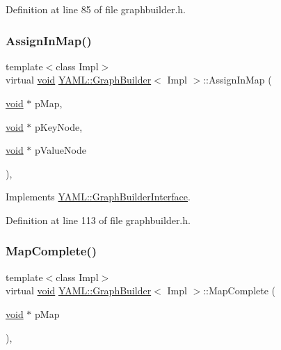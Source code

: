 Definition at line 85 of file graphbuilder.\+h.

\mbox{\label{class_y_a_m_l_1_1_graph_builder_a5f92ce9e395edd4a3ab8e3e6d772b570}} 
\subsubsection{\texorpdfstring{AssignInMap()}{AssignInMap()}}
{\footnotesize\ttfamily template$<$class Impl$>$ \\
virtual \mbox{\hyperlink{glad_8h_a950fc91edb4504f62f1c577bf4727c29}{void}} \mbox{\hyperlink{class_y_a_m_l_1_1_graph_builder}{Y\+A\+M\+L\+::\+Graph\+Builder}}$<$ Impl $>$\+::Assign\+In\+Map (\begin{DoxyParamCaption}\item[{\mbox{\hyperlink{glad_8h_a950fc91edb4504f62f1c577bf4727c29}{void}} $\ast$}]{p\+Map,  }\item[{\mbox{\hyperlink{glad_8h_a950fc91edb4504f62f1c577bf4727c29}{void}} $\ast$}]{p\+Key\+Node,  }\item[{\mbox{\hyperlink{glad_8h_a950fc91edb4504f62f1c577bf4727c29}{void}} $\ast$}]{p\+Value\+Node }\end{DoxyParamCaption})\hspace{0.3cm}{\ttfamily [inline]}, {\ttfamily [virtual]}}



Implements \mbox{\hyperlink{class_y_a_m_l_1_1_graph_builder_interface_a11538cc1796ebac94c10e0a3bab4b746}{Y\+A\+M\+L\+::\+Graph\+Builder\+Interface}}.



Definition at line 113 of file graphbuilder.\+h.

\mbox{\label{class_y_a_m_l_1_1_graph_builder_a351b27b50b691777d61412969b483a2d}} 
\subsubsection{\texorpdfstring{MapComplete()}{MapComplete()}}
{\footnotesize\ttfamily template$<$class Impl$>$ \\
virtual \mbox{\hyperlink{glad_8h_a950fc91edb4504f62f1c577bf4727c29}{void}} \mbox{\hyperlink{class_y_a_m_l_1_1_graph_builder}{Y\+A\+M\+L\+::\+Graph\+Builder}}$<$ Impl $>$\+::Map\+Complete (\begin{DoxyParamCaption}\item[{\mbox{\hyperlink{glad_8h_a950fc91edb4504f62f1c577bf4727c29}{void}} $\ast$}]{p\+Map }\end{DoxyParamCaption})\hspace{0.3cm}{\ttfamily [inline]}, {\ttfamily [virtual]}}



